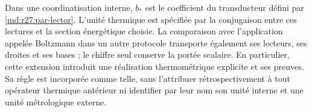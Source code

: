 Dans une coordinatisation interne, $b_*$ est le coefficient du transducteur défini par \eqref{md:r27:par-lector}. L'unité thermique est spécifiée par la conjugaison entre ces lectures et la section énergétique choisie. La comparaison avec l'application appelée Boltzmann dans un autre protocole transporte également ses lecteurs, ses droites et ses bases ; le chiffre seul conserve la portée scalaire. En particulier, cette extension introduit une réalisation thermométrique explicite et ses preuves. Sa règle est incorporée comme telle, sans l'attribuer rétrospectivement à tout opérateur thermique antérieur ni identifier par leur nom son unité interne et une unité métrologique externe.
